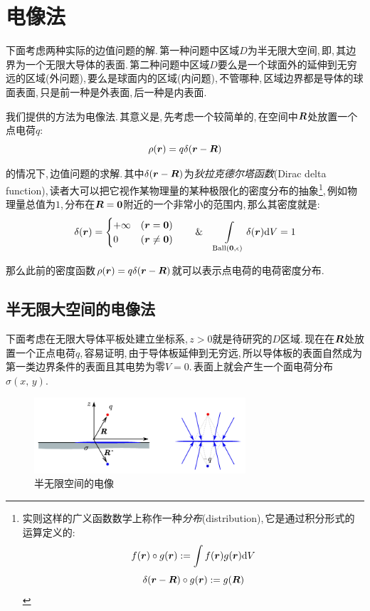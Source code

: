 \section{电像法}

下面考虑两种实际的边值问题的解.\,第一种问题中区域$D$为半无限大空间,\,即,\,其边界为一个无限大导体的表面.\,第二种问题中区域$D$要么是一个球面外的延伸到无穷远的区域(外问题),\,要么是球面内的区域(内问题),\,不管哪种,\,区域边界都是导体的球面表面,\,只是前一种是外表面,\,后一种是内表面.

我们提供的方法为电像法.\,其意义是,\,先考虑一个较简单的,\,在空间中$\boldsymbol{R}$处放置一个点电荷$q$:
\[\rho(\boldsymbol{r})=q\delta(\boldsymbol{r}-\boldsymbol{R})\]

的情况下,\,边值问题的求解.\,其中$\delta(\boldsymbol{r}-\boldsymbol{R})$为\emph{狄拉克德尔塔函数}(Dirac delta function),\,读者大可以把它视作某物理量的某种极限化的密度分布的抽象\footnote{实则这样的广义函数数学上称作一种\emph{分布}(distribution),\,它是通过积分形式的运算定义的:
\[f(\boldsymbol{r}) \circ g(\boldsymbol{r}):=\int f(\boldsymbol{r})g(\boldsymbol{r})\textrm{d} V\]
\[\delta(\boldsymbol{r}-\boldsymbol{R})\circ g(\boldsymbol{r}):=g(\boldsymbol{R})\]
},\,例如物理量总值为$1$,\,分布在$\boldsymbol{R}=\boldsymbol{0}$附近的一个非常小的范围内,\,那么其密度就是:
\[\delta(\boldsymbol{r})=\begin{cases}
	+\infty &(\boldsymbol{r}=\boldsymbol{0})\\
	0	&(\boldsymbol{r}\neq \boldsymbol{0})
\end{cases} \qquad \&\quad \int\limits_{\rm Ball(\boldsymbol{0},\epsilon)} \delta(\boldsymbol{r})\textrm{d} V=1\]

那么此前的密度函数$\rho(\boldsymbol{r})=q\delta(\boldsymbol{r}-\boldsymbol{R})$就可以表示点电荷的电荷密度分布.

\subsection{半无限大空间的电像法}

下面考虑在无限大导体平板处建立坐标系,\,$z>0$就是待研究的$D$区域.\,现在在$\boldsymbol{R}$处放置一个正点电荷$q$,\,容易证明,\,由于导体板延伸到无穷远,\,所以导体板的表面自然成为第一类边界条件的表面且其电势为零$V=0$.\,表面上就会产生一个面电荷分布$\sigma(x,\,y)$.
\begin{figure}[H]
\centering
\includegraphics[width=0.7\textwidth]{image/7-2-9.png}
\caption{半无限空间的电像}
\end{figure}

